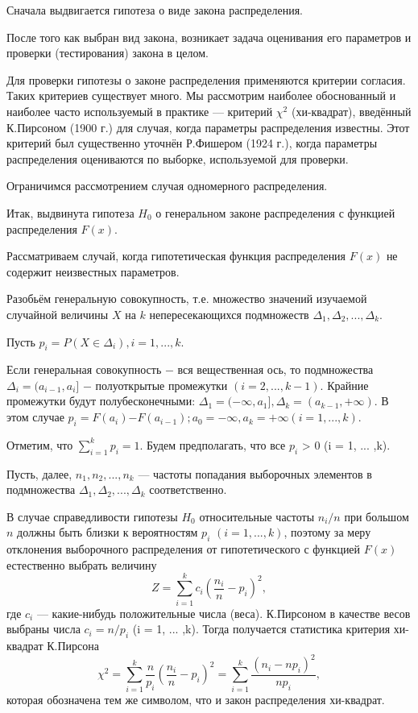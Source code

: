 \documentclass[12pt]{article}
\begin{document}
	Сначала выдвигается гипотеза о виде закона распределения.
	
	После того как выбран вид закона, возникает задача оценивания его параметров и проверки (тестирования) закона в целом.
	
	Для проверки гипотезы о законе распределения применяются критерии согласия. Таких критериев существует много. Мы рассмотрим наиболее обоснованный и наиболее часто используемый в практике — критерий $\chi^{2}$ (хи-квадрат), введённый К.Пирсоном (1900 г.) для случая, когда параметры распределения известны. Этот критерий был существенно уточнён Р.Фишером (1924 г.), когда параметры распределения оцениваются по выборке, используемой для проверки.
	
	Ограничимся рассмотрением случая одномерного распределения.
	
	Итак, выдвинута гипотеза $H_{0}$ о генеральном законе распределения с функцией распределения $F(x)$.
	
	Рассматриваем случай, когда гипотетическая функция распределения $F(x)$ не содержит неизвестных параметров.
	
	Разобьём генеральную совокупность, т.е. множество значений изучаемой случайной величины $X$ на $k$ непересекающихся подмножеств $\Delta_{1},\Delta_{2}, ... ,\Delta_{k}$.
	
	Пусть $p_{i} = P(X \in \Delta_{i}), i = 1, ... ,k$. 
	
	Если генеральная совокупность $-$ вся вещественная ось, то подмножества $\Delta_i = (a_{i-1},a_{i}]$ $-$ полуоткрытые промежутки $(i = 2, ... ,k-1)$. Крайние промежутки будут полубесконечными: $\Delta_{1} = (-\infty,a_{1}], \Delta_{k} = (a_{k-1},+\infty).$ В этом случае $p_{i} = F(a_{i})$$-$$F(a_{i-1}); a_{0} = -\infty, a_{k} = +\infty (i = 1, ... ,k).$
	
	Отметим, что $\sum_{i=1}^{k}{p_{i}} = 1$.
	Будем предполагать, что все $p_{i}$ > 0 (i = 1, ... ,k).
	
	Пусть, далее, $n_{1},n_{2}, ... ,n_{k}$ — частоты попадания выборочных элементов в подмножества $\Delta_{1},\Delta_{2}, ... ,\Delta_{k}$ соответственно.
	
	В случае справедливости гипотезы $H_{0}$ относительные частоты $n_{i}/n$ при большом $n$ должны быть близки к вероятностям $p_{i}$ $(i = 1, ... ,k)$, поэтому за меру отклонения выборочного распределения от гипотетического с функцией $F(x)$ естественно выбрать величину
	\begin{equation}
		Z = \sum_{i = 1}^{k}{c_{i}(\frac{n_{i}}{n} - p_{i})^{2}}, 
		\label{Z}
	\end{equation}
	где $c_{i}$ — какие-нибудь положительные числа (веса). К.Пирсоном в качестве весов выбраны числа $c_{i} = n/p_{i}$ (i = 1, ... ,k). Тогда получается статистика критерия хи-квадрат К.Пирсона
	\begin{equation}
		\chi^{2} = \sum_{i = 1}^{k}{\frac{n}{p_{i}}(\frac{n_{i}}{n} - p_{i})^{2}} = \sum_{i = 1}^{k}{\frac{(n_{i} - np_{i})^{2}}{np_{i}}}, 
		\label{chi_2}
	\end{equation}
	которая обозначена тем же символом, что и закон распределения хи-квадрат.
	
\end{document}
